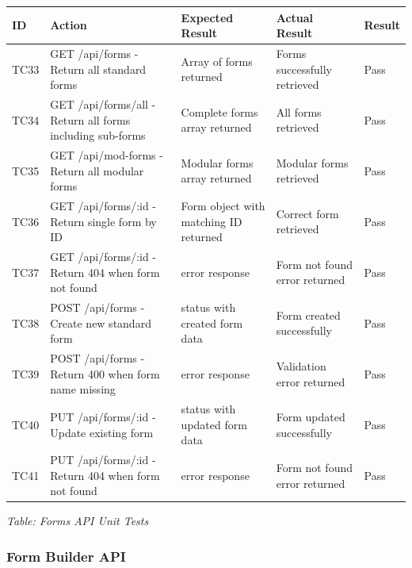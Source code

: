 \documentclass[12pt, titlepage]{article}
\begin{document}
\noindent
\begin{longtable}{|>{\raggedright\arraybackslash}p{1cm}|>{\raggedright\arraybackslash}p{5cm}|>{\raggedright\arraybackslash}p{3.25cm}|>{\raggedright\arraybackslash}p{3.25cm}|>{\raggedright\arraybackslash}p{1.5cm}|}
\hline
\textbf{ID} & \textbf{Action} & \textbf{Expected Result} & \textbf{Actual Result} & \textbf{Result} \\\hline
\endhead
\hline
TC33 & GET /api/forms - Return all standard forms & Array of forms returned & Forms successfully retrieved & \cellcolor{green!30}Pass \\
\hline
TC34 & GET /api/forms/all - Return all forms including sub-forms & Complete forms array returned & All forms retrieved & \cellcolor{green!30}Pass \\
\hline
TC35 & GET /api/mod-forms - Return all modular forms & Modular forms array returned & Modular forms retrieved & \cellcolor{green!30}Pass \\
\hline
TC36 & GET /api/forms/:id - Return single form by ID & Form object with matching ID returned & Correct form retrieved & \cellcolor{green!30}Pass \\
\hline
TC37 & GET /api/forms/:id - Return 404 when form not found & 404 error response & Form not found error returned & \cellcolor{green!30}Pass \\
\hline
TC38 & POST /api/forms - Create new standard form & 201 status with created form data & Form created successfully & \cellcolor{green!30}Pass \\
\hline
TC39 & POST /api/forms - Return 400 when form name missing & 400 error response & Validation error returned & \cellcolor{green!30}Pass \\
\hline
TC40 & PUT /api/forms/:id - Update existing form & 200 status with updated form data & Form updated successfully & \cellcolor{green!30}Pass \\
\hline
TC41 & PUT /api/forms/:id - Return 404 when form not found & 404 error response & Form not found error returned & \cellcolor{green!30}Pass \\
\hline
\end{longtable}

\vspace{0.5cm}

{\small \textit{Table: Forms API Unit Tests}}

\subsubsection{Form Builder API}
\end{document}

